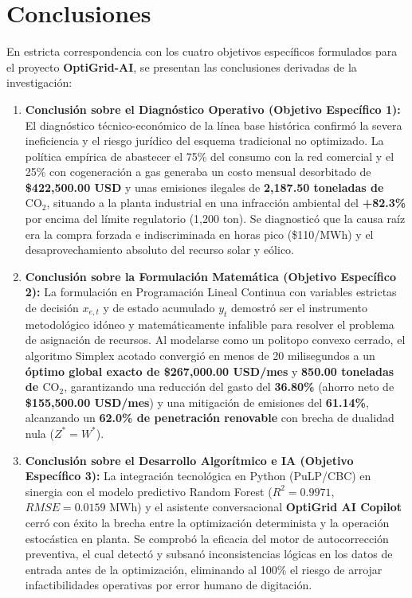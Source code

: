\documentclass[11pt,a4paper]{article}
\begin{document}
\section{Conclusiones}
En estricta correspondencia con los cuatro objetivos específicos formulados para el proyecto \textbf{OptiGrid-AI}, se presentan las conclusiones derivadas de la investigación:

\begin{enumerate}
    \item \textbf{Conclusión sobre el Diagnóstico Operativo (Objetivo Específico 1):}  
    El diagnóstico técnico-económico de la línea base histórica confirmó la severa ineficiencia y el riesgo jurídico del esquema tradicional no optimizado. La política empírica de abastecer el 75\% del consumo con la red comercial y el 25\% con cogeneración a gas generaba un costo mensual desorbitado de \textbf{\$422,500.00 USD} y unas emisiones ilegales de \textbf{2,187.50 toneladas de $\text{CO}_2$}, situando a la planta industrial en una infracción ambiental del \textbf{+82.3\%} por encima del límite regulatorio (1,200 ton). Se diagnosticó que la causa raíz era la compra forzada e indiscriminada en horas pico (\$110/MWh) y el desaprovechamiento absoluto del recurso solar y eólico.

    \item \textbf{Conclusión sobre la Formulación Matemática (Objetivo Específico 2):}  
    La formulación en Programación Lineal Continua con variables estrictas de decisión $x_{e,t}$ y de estado acumulado $y_t$ demostró ser el instrumento metodológico idóneo y matemáticamente infalible para resolver el problema de asignación de recursos. Al modelarse como un politopo convexo cerrado, el algoritmo Simplex acotado convergió en menos de 20 milisegundos a un \textbf{óptimo global exacto de \$267,000.00 USD/mes} y \textbf{850.00 toneladas de $\text{CO}_2$}, garantizando una reducción del gasto del \textbf{36.80\%} (ahorro neto de \textbf{\$155,500.00 USD/mes}) y una mitigación de emisiones del \textbf{61.14\%}, alcanzando un \textbf{62.0\% de penetración renovable} con brecha de dualidad nula ($Z^* = W^*$).

    \item \textbf{Conclusión sobre el Desarrollo Algorítmico e IA (Objetivo Específico 3):}  
    La integración tecnológica en Python (PuLP/CBC) en sinergia con el modelo predictivo Random Forest ($R^2 = 0.9971$, $RMSE = 0.0159\text{ MWh}$) y el asistente conversacional \textbf{OptiGrid AI Copilot} cerró con éxito la brecha entre la optimización determinista y la operación estocástica en planta. Se comprobó la eficacia del motor de autocorrección preventiva, el cual detectó y subsanó inconsistencias lógicas en los datos de entrada antes de la optimización, eliminando al 100\% el riesgo de arrojar infactibilidades operativas por error humano de digitación.


\end{enumerate}
\end{document}
